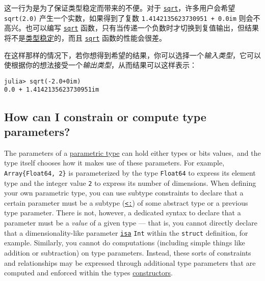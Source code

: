 这一行为是为了保证类型稳定而带来的不便。对于 \hyperlink{4551113327515323898}{\texttt{sqrt}}，许多用户会希望 \texttt{sqrt(2.0)} 产生一个实数，如果得到了复数 \texttt{1.4142135623730951 + 0.0im} 则会不高兴。也可以编写 \hyperlink{4551113327515323898}{\texttt{sqrt}} 函数，只有当传递一个负数时才切换到复值输出，但结果将不是\hyperlink{5872221809740029239}{类型稳定}的，而且 \hyperlink{4551113327515323898}{\texttt{sqrt}} 函数的性能会很差。



在这样那样的情况下，若你想得到希望的结果，你可以选择一个\emph{输入类型}，它可以使根据你的想法接受一个\emph{输出类型}，从而结果可以这样表示：




\begin{verbatim}
julia> sqrt(-2.0+0im)
0.0 + 1.4142135623730951im
\end{verbatim}



\hypertarget{11272547309716265284}{}


\subsection{How can I constrain or compute type parameters?}



The parameters of a \href{@ref Parametric-Types}{parametric type} can hold either types or bits values, and the type itself chooses how it makes use of these parameters. For example, \texttt{Array\{Float64, 2\}} is parameterized by the type \texttt{Float64} to express its element type and the integer value \texttt{2} to express its number of dimensions.  When defining your own parametric type, you can use subtype constraints to declare that a certain parameter must be a subtype (\hyperlink{6254591906563366276}{\texttt{<:}}) of some abstract type or a previous type parameter.  There is not, however, a dedicated syntax to declare that a parameter must be a \emph{value} of a given type — that is, you cannot directly declare that a dimensionality-like parameter \hyperlink{7066325108767373297}{\texttt{isa}} \texttt{Int} within the \texttt{struct} definition, for example.  Similarly, you cannot do computations (including simple things like addition or subtraction) on type parameters.  Instead, these sorts of constraints and relationships may be expressed through additional type parameters that are computed and enforced within the type{\textquotesingle}s \hyperlink{1489967485005487723}{constructors}.



